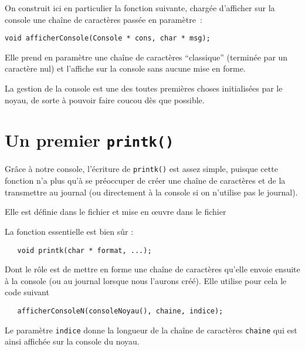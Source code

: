    On construit ici en particulier la fonction suivante, chargée
d'afficher sur la console une chaîne de caractères passée en paramètre~:

\begin{lstlisting}
void afficherConsole(Console * cons, char * msg);
\end{lstlisting}

   Elle prend en paramètre une chaîne de caractères ``classique''
(terminée par un caractère nul) et l'affiche sur la console sans aucune
mise en forme.

   La gestion de la console est une des toutes premières choses
initialisées par le noyau, de sorte à pouvoir faire coucou dès que
possible.

%
\section{Un premier {\tt printk()}}

   Grâce à notre console, l'écriture de {\tt printk()} est assez
simple, puisque cette fonction n'a plus qu'à se préoccuper de créer
une chaîne de caractères et de la transmettre au journal (ou
directement à la console si on n'utilise pas le journal).

   Elle est définie dans le fichier 
   et mise en \oe{}uvre dans le fichier

   La fonction essentielle est bien sûr :

\begin{lstlisting}
   void printk(char * format, ...);
\end{lstlisting} 

   Dont le rôle est de mettre en forme une chaîne de caractères
qu'elle envoie ensuite à la console (ou au journal lorsque nous
l'aurons créé). Elle utilise pour cela le code suivant

\begin{lstlisting}
   afficherConsoleN(consoleNoyau(), chaine, indice);  
\end{lstlisting}

   Le paramètre \lstinline!indice! donne la longueur de la chaîne de
caractères \lstinline!chaine! qui est ainsi affichée sur la console du
noyau.
   
%
